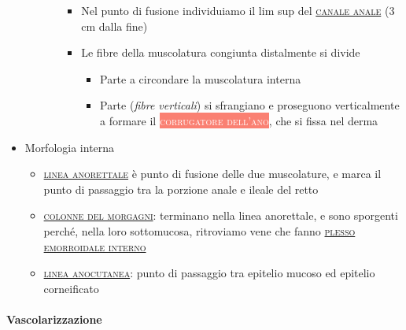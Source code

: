 \documentclass[italian,]{article}
\providecommand{\tightlist}{%
  \setlength{\itemsep}{0pt}\setlength{\parskip}{0pt}}
\newcommand{\mus}[1]{\colorbox{Salmon}{\textcolor{white}{\textsc{#1}}}}
\renewcommand{\a}[1]{\underline{\textsc{#1}}}
\begin{document}
\begin{itemize}
\begin{itemize}
\begin{itemize}
      \begin{itemize}
      \tightlist
      \item
        Nel punto di fusione individuiamo il lim sup del
        \a{canale anale} (3 cm dalla fine)
      \item
        Le fibre della muscolatura congiunta distalmente si divide

        \begin{itemize}
        \tightlist
        \item
          Parte a circondare la muscolatura interna
        \item
          Parte (\emph{fibre verticali}) si sfrangiano e proseguono
          verticalmente a formare il \mus{corrugatore dell'ano}, che si
          fissa nel derma
        \end{itemize}
      \end{itemize}
    \end{itemize}
  \end{itemize}
\item
  Morfologia interna

  \begin{itemize}
  \tightlist
  \item
    \a{linea anorettale} è punto di fusione delle due muscolature, e
    marca il punto di passaggio tra la porzione anale e ileale del retto
  \item
    \a{colonne del morgagni}: terminano nella linea anorettale, e sono
    sporgenti perché, nella loro sottomucosa, ritroviamo vene che fanno
    \a{plesso emorroidale interno}
  \item
    \a{linea anocutanea}: punto di passaggio tra epitelio mucoso ed
    epitelio corneificato
  \end{itemize}
\end{itemize}

\hypertarget{vascolarizzazione-3}{%
\paragraph{Vascolarizzazione}\label{vascolarizzazione-3}}
\end{document}
